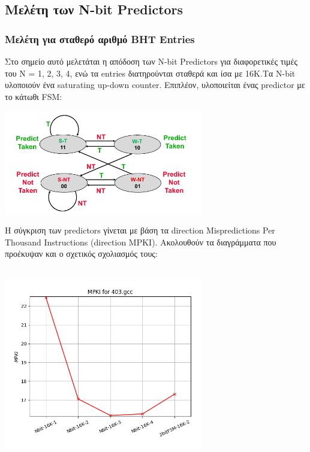 \newpage
\subsection{Μελέτη των N-bit Predictors}
\vspace{3mm}

\subsubsection{Μελέτη για σταθερό αριθμό BHT Entries}
Στο σημείο αυτό μελετάται η απόδοση των N-bit Predictors για διαφορετικές τιμές
του N = 1, 2, 3, 4, ενώ τα entries διατηρούνται σταθερά και ίσα με 16Κ.Τα N-bit
υλοποιούν ένα saturating up-down counter. Επιπλέον, υλοποιείται ένας predictor
με το κάτωθι FSM:

\begin{center}
   \vspace{3mm}
      \includegraphics[width=0.65\textwidth, frame]{./imgs/fsm.png}
   \vspace{6mm}
\end{center}


\vspace{1em}    
Η σύγκριση των predictors γίνεται με βάση τα direction Mispredictions Per
Thousand Instructions (direction MPKI). Ακολουθούν τα διαγράμματα που
προέκυψαν και ο σχετικός σχολιασμός τους:

   \begin{minipage}{\textwidth}
      \begin{center}
         \\
         \vspace{3mm}
         \includegraphics[width=0.65\textwidth, frame]{./graphs/4-2i/403-gcc.png}
         \vspace{6mm}
      \end{center}
   \end{minipage}


